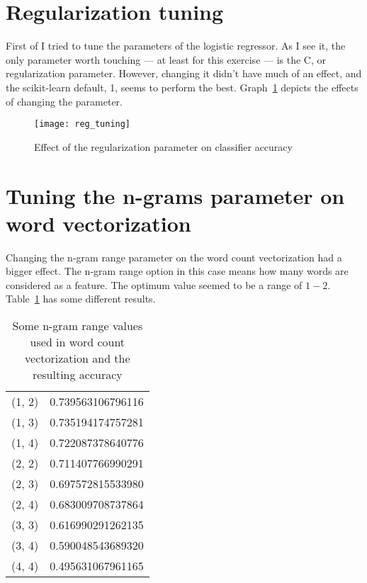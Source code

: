 \section{Regularization tuning}

First of I tried to tune the parameters of the logistic regressor. As I see it,
the only parameter worth touching --- at least for this exercise --- is the C,
or regularization parameter. However, changing it didn't have much of an
effect, and the scikit-learn default, 1, seems to perform the best.
Graph~\ref{fig:reg_tuning} depicts the effects of changing the parameter.

\begin{figure}[H]
  \centering
  \texttt{[image: reg\_tuning]}
  \caption{Effect of the regularization parameter on classifier accuracy}\label{fig:reg_tuning}
\end{figure}



\section{Tuning the n-grams parameter on word vectorization}

Changing the n-gram range parameter on the word count vectorization had a
bigger effect. The n-gram range option in this case means how many words are
considered as a feature. The optimum value seemed to be a range of \(1-2\).
Table~\ref{tab:ngram} has some different results.

\begin{table}[H]
  \centering
  \caption{Some n-gram range values used in word count vectorization and the
  resulting accuracy}\label{tab:ngram}
  \begin{tabular}{c c}
    \toprule
    (1, 2)  &  \num{0.739563106796116} \\
    (1, 3)  &  \num{0.735194174757281} \\
    (1, 4)  &  \num{0.722087378640776} \\
    (2, 2)  &  \num{0.711407766990291} \\
    (2, 3)  &  \num{0.697572815533980} \\
    (2, 4)  &  \num{0.683009708737864} \\
    (3, 3)  &  \num{0.616990291262135} \\
    (3, 4)  &  \num{0.590048543689320} \\
    (4, 4)  &  \num{0.495631067961165} \\
    \bottomrule
  \end{tabular}
\end{table}



